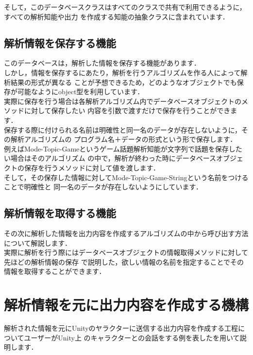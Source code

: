 そして，このデータベースクラスはすべてのクラスで共有で利用できるように，すべての解析知能や出力
を作成する知能の抽象クラスに含まれています．\\

\subsection{解析情報を保存する機能}
このデータベースは，解析した情報を保存する機能があります．\\
しかし，情報を保存するにあたり，解析を行うアルゴリズムを作る人によって解析結果の形式が異なる
ことが予想できるため，どのようなオブジェクトでも保存が可能なようにobject型を利用しています．\\

実際に保存を行う場合は各解析アルゴリズム内でデータベースオブジェクトのメソッドに対して保存したい
内容を引数で渡すだけで保存を行うことができます．\\

保存する際に付けられる名前は明確性と同一名のデータが存在しないように，その解析アルゴリズムの
プログラム名＋データの形式という形で保存します．\\

例えばMode-Topic-Gameというゲーム話題解析知能が文字列で話題を保存したい場合はそのアルゴリズム
の中で，解析が終わった時にデータベースオブジェクトの保存を行うメソッドに対して値を渡します．\\

そして，その保存した情報に対してMode-Topic-Game-Stringという名前をつけることで明確性と
同一名のデータが存在しないようにしています．\\

\subsection{解析情報を取得する機能}
その次に解析した情報を出力内容を作成するアルゴリズムの中から呼び出す方法について解説します．\\
実際に解析を行う際にはデータベースオブジェクトの情報取得メソッドに対して先ほどの解析情報の保存
で説明した，欲しい情報の名前を指定することでその情報を取得することができます．\\

\newpage


\section{解析情報を元に出力内容を作成する機構}
解析された情報を元にUnityのヤラクターに送信する出力内容を作成する工程についてユーザーがUnity上
のキャラクターとの会話をする例を表したを用いて説明します．

